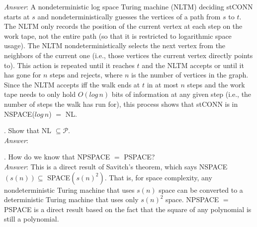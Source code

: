 \documentclass{scrartcl}
\begin{document}
    \noindent
    \textit{Answer}: A nondeterministic log space Turing machine (NLTM) deciding \textsf{stCONN}
    starts at $s$ and nondeterministically guesses the vertices of a path from $s$ to $t$. The NLTM
    only records the position of the current vertex at each step on the work tape, not the entire
    path (so that it is restricted to logarithmic space usage). The NLTM nondeterministically
    selects the next vertex from the neighbors of the current one (i.e., those vertices the current
    vertex directly points to). This action is repeated until it reaches $t$ and the NLTM accepts or
    until it has gone for $n$ steps and rejects, where $n$ is the number of vertices in the graph.
    Since the NLTM accepts iff the walk ends at $t$ in at most $n$ steps and the work tape needs to
    only hold $O(log\,n)$ bits of information at any given step (i.e., the number of steps the walk
    has run for), this process shows that \textsf{stCONN} is in \textsf{NSPACE($log\,n$) $=$ NL}.

    \newpage
    . Show that \textsf{NL} $\subseteq \mathcal{P}$.\\

    \noindent
    \textit{Answer}:

    \bigskip
    . How do we know that \textsf{NPSPACE $=$ PSPACE}?\\

    \noindent
    \textit{Answer}: This is a direct result of Savitch's theorem, which says \textsf{NSPACE$(s(n))
    \subseteq$ SPACE$(s(n)^2)$}. That is, for space complexity, any nondeterministic Turing machine
    that uses $s(n)$ space can be converted to a deterministic Turing machine that uses only
    $s(n)^2$ space. \textsf{NPSPACE $=$ PSPACE} is a direct result based on the fact that the square
    of any polynomial is still a polynomial.\\
\end{document}
